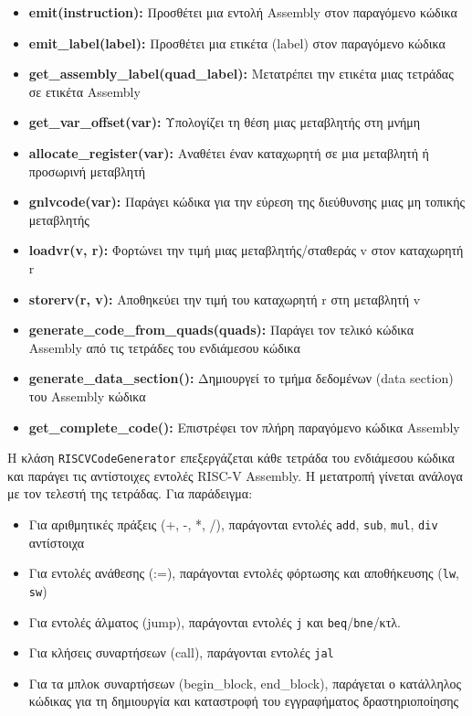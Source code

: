 \documentclass[12pt,a4paper]{article}
\begin{document}
\begin{itemize}
    \item \textbf{emit(instruction):} Προσθέτει μια εντολή Assembly στον παραγόμενο κώδικα

    \item \textbf{emit\_label(label):} Προσθέτει μια ετικέτα (label) στον παραγόμενο κώδικα

    \item \textbf{get\_assembly\_label(quad\_label):} Μετατρέπει την ετικέτα μιας τετράδας σε ετικέτα Assembly

    \item \textbf{get\_var\_offset(var):} Υπολογίζει τη θέση μιας μεταβλητής στη μνήμη

    \item \textbf{allocate\_register(var):} Αναθέτει έναν καταχωρητή σε μια μεταβλητή ή προσωρινή μεταβλητή

    \item \textbf{gnlvcode(var):} Παράγει κώδικα για την εύρεση της διεύθυνσης μιας μη τοπικής μεταβλητής

    \item \textbf{loadvr(v, r):} Φορτώνει την τιμή μιας μεταβλητής/σταθεράς v στον καταχωρητή r

    \item \textbf{storerv(r, v):} Αποθηκεύει την τιμή του καταχωρητή r στη μεταβλητή v

    \item \textbf{generate\_code\_from\_quads(quads):} Παράγει τον τελικό κώδικα Assembly από τις τετράδες του ενδιάμεσου κώδικα

    \item \textbf{generate\_data\_section():} Δημιουργεί το τμήμα δεδομένων (data section) του Assembly κώδικα

    \item \textbf{get\_complete\_code():} Επιστρέφει τον πλήρη παραγόμενο κώδικα Assembly
\end{itemize}

Η κλάση \texttt{RISCVCodeGenerator} επεξεργάζεται κάθε τετράδα του ενδιάμεσου κώδικα και παράγει τις αντίστοιχες εντολές RISC-V Assembly. Η μετατροπή γίνεται ανάλογα με τον τελεστή της τετράδας. Για παράδειγμα:

\begin{itemize}
    \item Για αριθμητικές πράξεις (+, -, *, /), παράγονται εντολές \texttt{add}, \texttt{sub}, \texttt{mul}, \texttt{div} αντίστοιχα
    \item Για εντολές ανάθεσης (:=), παράγονται εντολές φόρτωσης και αποθήκευσης (\texttt{lw}, \texttt{sw})
    \item Για εντολές άλματος (jump), παράγονται εντολές \texttt{j} και \texttt{beq}/\texttt{bne}/κτλ.
    \item Για κλήσεις συναρτήσεων (call), παράγονται εντολές \texttt{jal}
    \item Για τα μπλοκ συναρτήσεων (begin\_block, end\_block), παράγεται ο κατάλληλος κώδικας για τη δημιουργία και καταστροφή του εγγραφήματος δραστηριοποίησης
\end{itemize}
\end{document}
